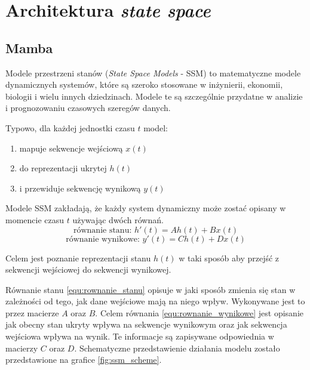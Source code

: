 \documentclass[data-science]{agh-wi} %
\begin{document}

\section{Architektura \textit{state space}}
\subsection{Mamba}

Modele przestrzeni stanów (\textit{State Space Models} - SSM) to matematyczne modele dynamicznych systemów, które są szeroko stosowane w inżynierii, ekonomii, biologii i wielu innych dziedzinach. Modele te są szczególnie przydatne w analizie i prognozowaniu czasowych szeregów danych.

Typowo, dla każdej jednostki czasu $t$ model:
\begin{enumerate}
    \item mapuje sekwencje wejściową $x(t)$
    \item do reprezentacji ukrytej $h(t)$
    \item i przewiduje sekwencję wynikową $y(t)$
\end{enumerate}

Modele SSM zakładają, że każdy system dynamiczny może zostać opisany w momencie czasu $t$ używając dwóch równań.
\begin{equation}
    \text{równanie stanu: }h'(t) = Ah(t) + Bx(t)
    \label{equ:rownanie_stanu}
\end{equation}
\begin{equation}
    \text{równanie wynikowe: }y'(t) = Ch(t) + Dx(t)
    \label{equ:rownanie_wynikowe}
\end{equation}

Celem jest poznanie reprezentacji stanu $h(t)$  w taki sposób aby przejść z sekwencji wejściowej do sekwencji wynikowej.

Równanie stanu \ref*{equ:rownanie_stanu} opisuje w jaki sposób zmienia się stan w zależności od tego, jak dane wejściowe mają na niego wpływ. Wykonywane jest to przez macierze $A$ oraz $B$. Celem równania \ref*{equ:rownanie_wynikowe} jest opisanie jak obecny stan ukryty wpływa na sekwencje wynikowym oraz jak sekwencja wejściowa wpływa na wynik. Te informacje są zapisywane odpowiednia w macierzy $C$ oraz $D$. Schematyczne przedstawienie działania modelu zostało przedstawione na grafice \ref*{fig:ssm_scheme}.
\end{document}
